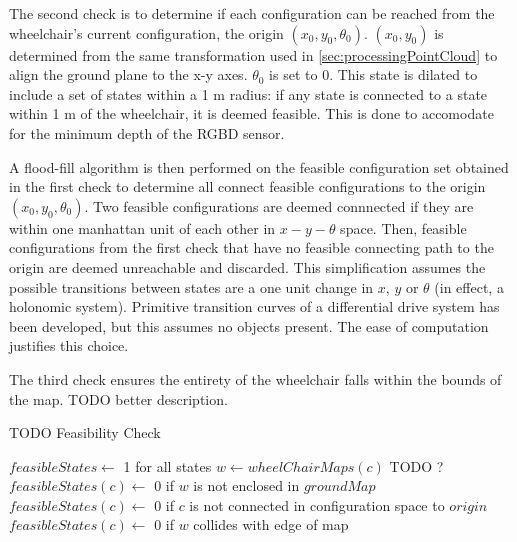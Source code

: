The second check is to determine if each configuration can be reached from the
wheelchair's current configuration, the origin $(x_0,y_0,\theta_0)$. $(x_0,y_0)$
is determined from the same transformation used in
\autoref{sec:processingPointCloud} to align the ground plane to the x-y axes.
$\theta_0$ is set to $0$. 
This state is dilated to include a set of states within a 1 m radius: if any
state is connected to a state within 1 m of the wheelchair, it is deemed
feasible. This is done to accomodate for the minimum depth of the RGBD sensor.


A flood-fill algorithm is then performed on the
feasible configuration set obtained in the first check to determine all connect
feasible configurations to the origin $(x_0,y_0,\theta_0)$. Two feasible
configurations are deemed connnected if they are within one manhattan unit of
each other in $x-y-\theta$ space.
Then, feasible configurations from the first check that have no feasible
connecting path to the origin are deemed unreachable and discarded. 
This simplification assumes the possible transitions between states are a one
unit change in $x$, $y$ or $\theta$ (in effect, a holonomic system). 
Primitive transition curves of a differential drive system
\cite{balkcom2002time} has been developed, but this assumes no objects present.
The ease of computation justifies this choice.


The third check ensures the entirety of the wheelchair falls within the bounds
of the map. TODO better description.

\begin{algorithm}
\caption{TODO Feasibility Check}
\label{alg:feasibilitycheck}
\begin{algorithmic}[1]
\Statex
{}
    \State $feasibleStates \gets$ 1 for all states
        \State $w \gets wheelChairMaps(c)$ TODO ?
        \State $feasibleStates(c) \gets$ 0 if $w$ is not enclosed in $groundMap$
        \State $feasibleStates(c) \gets$ 0 if $c$ is not connected in configuration space to $origin$
        \State $feasibleStates(c) \gets$ 0 if $w$ collides with edge of map
    \EndFor
\EndFunction
\Statex
{}
\end{algorithmic}
\end{algorithm}

